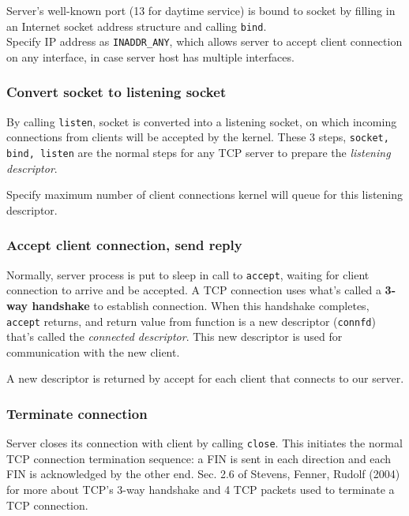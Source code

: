\documentclass[10pt]{amsart}
\begin{document}
\begin{multicols*}{2}
Server's well-known port (13 for daytime service) is bound to socket by filling in an Internet socket address structure and calling \verb|bind|. \\
Specify IP address as \verb|INADDR_ANY|, which allows server to accept client connection on any interface, in case server host has multiple interfaces.

\subsubsection{Convert socket to listening socket}

By calling \verb|listen|, socket is converted into a listening socket, on which incoming connections from clients will be accepted by the kernel. These 3 steps, \verb|socket, bind, listen| are the normal steps for any TCP server to prepare the \emph{listening descriptor}.

Specify maximum number of client connections kernel will queue for this listening descriptor.

\subsubsection{Accept client connection, send reply}

Normally, server process is put to sleep in call to \verb|accept|, waiting for client connection to arrive and be accepted. A TCP connection uses what's called a \textbf{3-way handshake} to establish connection. When this handshake completes, \verb|accept| returns, and return value from function is a new descriptor (\verb|connfd|) that's called the \emph{connected descriptor}. This new descriptor is used for communication with the new client.

A new descriptor is returned by accept for each client that connects to our server.

\subsubsection{Terminate connection} 

Server closes its connection with client by calling \verb|close|. This initiates the normal TCP connection termination sequence: a FIN is sent in each direction and each FIN is acknowledged by the other end. Sec. 2.6 of Stevens, Fenner, Rudolf (2004) \cite{SFR2004} for more about TCP's 3-way handshake and 4 TCP packets used to terminate a TCP connection.



\end{multicols*}
\end{document}
